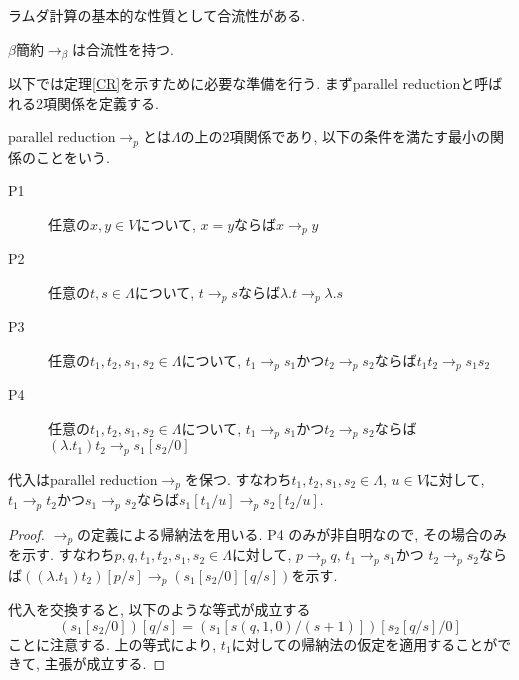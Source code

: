 \documentclass{ltjsarticle}
\begin{document}
ラムダ計算の基本的な性質として合流性がある.

\begin{thm}\label{CR}
 $\beta$簡約$\rightarrow_{\beta}$は合流性を持つ.
\end{thm}

以下では定理\ref{CR}を示すために必要な準備を行う. まずparallel reductionと呼ばれる2項関係を定義する.

\begin{defn}
 parallel reduction$\rightarrow_{p}$とは$\Lambda$の上の$2$項関係であり, 以下の条件を満たす最小の関係のことをいう.
 \begin{description}
  \item[P1] 任意の$x, y \in V$について, $x = y$ならば$x \rightarrow_{p} y$
  \item[P2] 任意の$t, s \in \Lambda$について, $t \rightarrow_{p} s$ならば$\lambda. t \rightarrow_{p} \lambda. s$
  \item[P3] 任意の$t_1, t_2, s_1, s_2 \in \Lambda$について,
        $t_1 \rightarrow_{p} s_1$かつ$t_2 \rightarrow_{p} s_2$ならば$t_1 t_2 \rightarrow_{p} s_1 s_2$
  \item[P4] 任意の$t_1, t_2, s_1, s_2 \in \Lambda$について,
        $t_1 \rightarrow_{p} s_1$かつ$t_2 \rightarrow_{p} s_2$ならば$(\lambda. t_1) t_2 \rightarrow_{p} s_1[s_2/0]$
 \end{description}
\end{defn}

\begin{lem}
 代入はparallel reduction$\rightarrow_{p}$を保つ. すなわち$t_1, t_2, s_1, s_2 \in \Lambda$, $u \in V$に対して, $t_1 \rightarrow_{p} t_2$かつ$s_1 \rightarrow_{p} s_2$ならば$s_1[t_1/u] \rightarrow_{p} s_2[t_2/u]$.
\end{lem}

\begin{proof}
 $\rightarrow_{p}$の定義による帰納法を用いる. P4%
のみが非自明なので, その場合のみを示す.
 すなわち$p, q, t_1, t_2, s_1, s_2 \in \Lambda$に対して,
$p \rightarrow_{p} q$, $t_1 \rightarrow_{p} s_1$かつ $t_2 \rightarrow_{p} s_2$ならば$((\lambda. t_1) t_2) [p / s] \rightarrow_{p} (s_1 [s_2 / 0] [q / s])$を示す.
 
 代入を交換すると, 以下のような等式が成立する
 \[
 (s_1 [s_2 / 0]) [q / s] = (s_1 [s(q, 1, 0) / (s + 1)]) [s_2 [q / s] / 0]
 \]
 ことに注意する. 上の等式により, $t_1$に対しての帰納法の仮定を適用することができて, 主張が成立する.
\end{proof}
\end{document}
